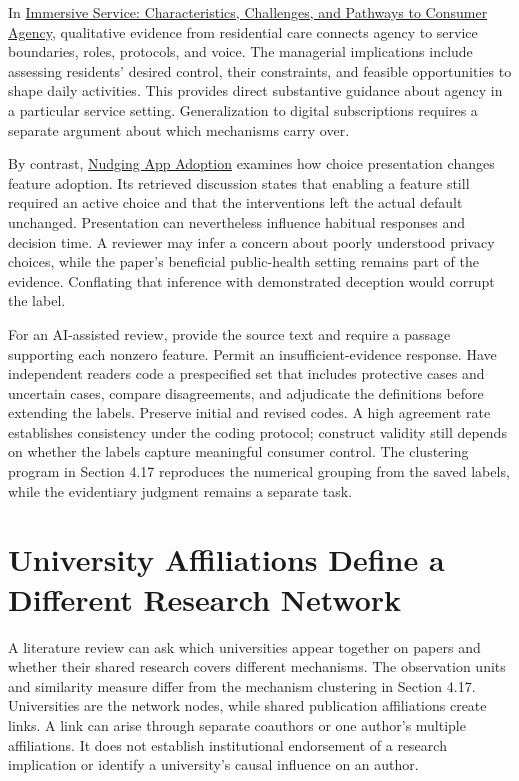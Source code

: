 In \href{https://doi.org/10.1177/00222429251319312}{Immersive Service:
Characteristics, Challenges, and Pathways to Consumer Agency},
qualitative evidence from residential care connects agency to service
boundaries, roles, protocols, and voice. The managerial implications
include assessing residents' desired control, their constraints, and
feasible opportunities to shape daily activities. This provides direct
substantive guidance about agency in a particular service setting.
Generalization to digital subscriptions requires a separate argument
about which mechanisms carry over.

By contrast, \href{https://doi.org/10.1177/00222429221141066}{Nudging
App Adoption} examines how choice presentation changes feature adoption.
Its retrieved discussion states that enabling a feature still required
an active choice and that the interventions left the actual default
unchanged. Presentation can nevertheless influence habitual responses
and decision time. A reviewer may infer a concern about poorly
understood privacy choices, while the paper's beneficial public-health
setting remains part of the evidence. Conflating that inference with
demonstrated deception would corrupt the label.

For an AI-assisted review, provide the source text and require a passage
supporting each nonzero feature. Permit an insufficient-evidence
response. Have independent readers code a prespecified set that includes
protective cases and uncertain cases, compare disagreements, and
adjudicate the definitions before extending the labels. Preserve initial
and revised codes. A high agreement rate establishes consistency under
the coding protocol; construct validity still depends on whether the
labels capture meaningful consumer control. The clustering program in
Section 4.17 reproduces the numerical grouping from the saved labels,
while the evidentiary judgment remains a separate task.

\hypertarget{M05-university-affiliations-define-a-different-research-network}{%
\section{University Affiliations Define a Different Research
Network}\label{M05-university-affiliations-define-a-different-research-network}}

\noindent \noindent A literature review can ask which universities appear together
on papers and whether their shared research covers different mechanisms.
The observation units and similarity measure differ from the mechanism
clustering in Section 4.17. Universities are the network nodes, while
shared publication affiliations create links. A link can arise through
separate coauthors or one author's multiple affiliations. It does not
establish institutional endorsement of a research implication or
identify a university's causal influence on an author.

